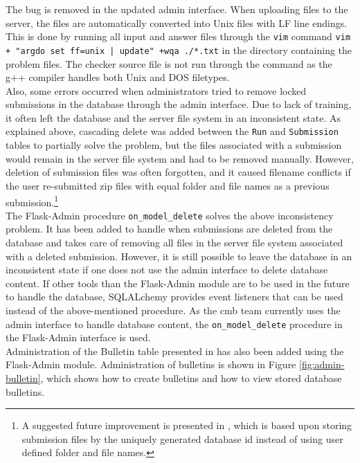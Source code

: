 The bug is removed in the updated admin interface. When uploading files to the server, the files are automatically converted into Unix files with LF line endings. This is done by running all input and answer files through the \texttt{vim} \cite{VIM} command \texttt{vim + "argdo set ff=unix | update" +wqa ./*.txt} in the directory containing the problem files. The checker source file is not run through the command as the g++ compiler handles both Unix and DOS filetypes. \\

Also, some errors occurred when administrators tried to remove locked submissions in the database through the admin interface. Due to lack of training, it often left the database and the server file system in an inconsistent state. As explained above, cascading delete was added between the \texttt{Run} and \texttt{Submission} tables to partially solve the problem, but the files associated with a submission would remain in the server file system and had to be removed manually. However, deletion of submission files was often forgotten, and it caused filename conflicts if the user re-submitted zip files with equal folder and file names as a previous submission.\footnote{A suggested future improvement is presented in , which is based upon storing submission files by the uniquely generated database id instead of using user defined folder and file names.}\\

The Flask-Admin \cite{FLASKADMIN} procedure \texttt{on\_model\_delete} solves the above inconsistency problem. It has been added to handle when submissions are deleted from the database and takes care of removing all files in the server file system associated with a deleted submission. However, it is still possible to leave the database in an inconsistent state if one does not use the admin interface to delete database content. If other tools than the Flask-Admin module are to be used in the future to handle the database, SQLALchemy provides event listeners that can be used instead of the above-mentioned procedure. As the \gls{cmb} team currently uses the admin interface to handle database content, the \texttt{on\_model\_delete} procedure in the Flask-Admin interface is used. \\

Administration of the Bulletin table presented in  has also been added using the Flask-Admin module. Administration of bulletins is shown in Figure \ref{fig:admin-bulletin}, which shows how to create bulletins and how to view stored database bulletins.


